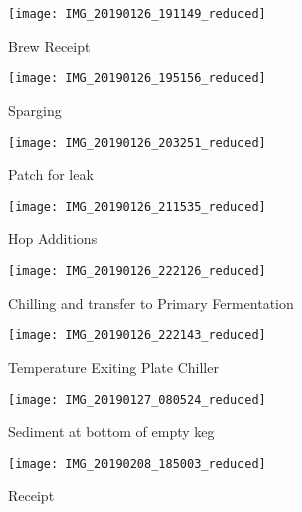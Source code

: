 \begin{figure}[H]
  \centering
  \texttt{[image: IMG\_20190126\_191149\_reduced]}
  \caption{Brew Receipt}\label{fig:brew:receipt}
\end{figure}

\begin{figure}[H]
  \centering
  \texttt{[image: IMG\_20190126\_195156\_reduced]}
  \caption{Sparging}\label{fig:brew:sparge}
\end{figure}

\begin{figure}[H]
  \centering
  \texttt{[image: IMG\_20190126\_203251\_reduced]}
  \caption{Patch for leak}\label{fig:brew:leak}
\end{figure}

\begin{figure}[H]
  \centering
  \texttt{[image: IMG\_20190126\_211535\_reduced]}
  \caption{Hop Additions}\label{fig:brew:hopadditions}
\end{figure}

\begin{figure}[H]
  \centering
  \texttt{[image: IMG\_20190126\_222126\_reduced]}
  \caption{Chilling and transfer to Primary Fermentation}\label{fig:brew:chilling}
\end{figure}

\begin{figure}[H]
  \centering
  \texttt{[image: IMG\_20190126\_222143\_reduced]}
  \caption{Temperature Exiting Plate Chiller}\label{fig:brew:chilltemp}
\end{figure}

\begin{figure}[H]
  \centering
  \texttt{[image: IMG\_20190127\_080524\_reduced]}
  \caption{Sediment at bottom of empty keg}\label{fig:keg1:empty}
\end{figure}

\begin{figure}[H]
  \centering
  \texttt{[image: IMG\_20190208\_185003\_reduced]}
  \caption{Receipt}\label{fig:brew:receipt}
\end{figure}

\def\todaysdate{20190209}
\newday{\todaysdate}\label{\todaysdate}

